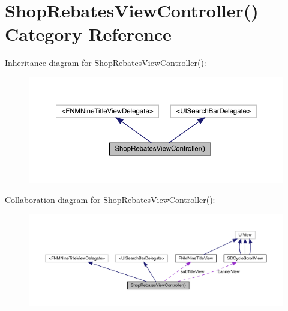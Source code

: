 \hypertarget{category_shop_rebates_view_controller_07_08}{}\section{Shop\+Rebates\+View\+Controller() Category Reference}
\label{category_shop_rebates_view_controller_07_08}


Inheritance diagram for Shop\+Rebates\+View\+Controller()\+:\nopagebreak
\begin{figure}[H]
\begin{center}
\leavevmode
\includegraphics[width=350pt]{category_shop_rebates_view_controller_07_08__inherit__graph}
\end{center}
\end{figure}


Collaboration diagram for Shop\+Rebates\+View\+Controller()\+:\nopagebreak
\begin{figure}[H]
\begin{center}
\leavevmode
\includegraphics[width=350pt]{category_shop_rebates_view_controller_07_08__coll__graph}
\end{center}
\end{figure}
